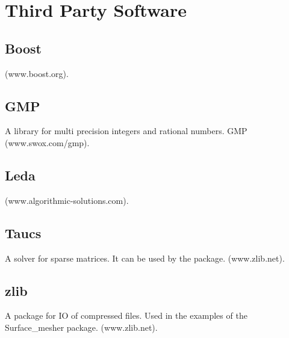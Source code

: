 \section{Third Party Software}

\subsection{Boost \label{thirdparty:boost}}

 (www.boost.org).


\subsection{GMP \label{thirdparty:gmp}}

A library for multi precision integers and rational numbers.
GMP (www.swox.com/gmp).



\subsection{Leda \label{thirdparty:leda}}

 (www.algorithmic-solutions.com).


\subsection{Taucs \label{thirdparty:zlib}}

A solver for sparse matrices.
It can be used by the  package.
 (www.zlib.net).

\subsection{zlib \label{thirdparty:zlib}}

A package for IO of compressed files.
Used in the examples of the Surface_mesher package.
 (www.zlib.net).